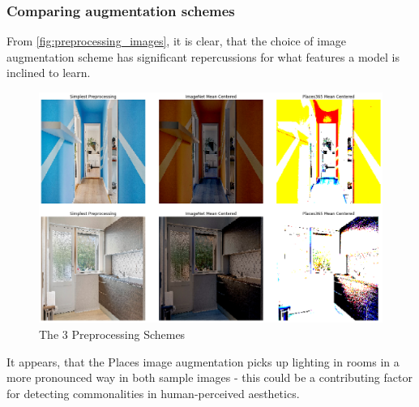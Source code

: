 \subsubsection{Comparing augmentation schemes}
From \autoref{fig:preprocessing_images}, it is clear, that the choice of image augmentation scheme has significant repercussions for what features a model is inclined to learn. 

\begin{figure}[H]
    \centering
    \includegraphics[scale=0.3]{pictures/plots/image2_preprocessing}
    \caption{The 3 Preprocessing Schemes}
    \label{fig:preprocessing_images}
\end{figure}

It appears, that the Places image augmentation picks up lighting in rooms in a more pronounced way in both sample images - this could be a contributing factor for detecting commonalities in human-perceived aesthetics. 